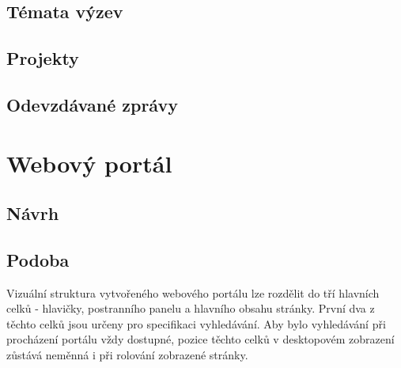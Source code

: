 \subsection{Témata výzev}
\blindtext

\subsection{Projekty}
\blindtext

\subsection{Odevzdávané zprávy}
\blindtext



\section{Webový portál}
\blindtext

\subsection{Návrh}
\blindtext

\subsection{Podoba}
Vizuální struktura vytvořeného webového portálu lze rozdělit do tří hlavních celků - hlavičky, postranního panelu a hlavního obsahu stránky. První dva z těchto celků jsou určeny pro specifikaci vyhledávání. Aby bylo vyhledávání při procházení portálu vždy dostupné, pozice těchto celků v desktopovém zobrazení zůstává neměnná i při rolování zobrazené stránky.


